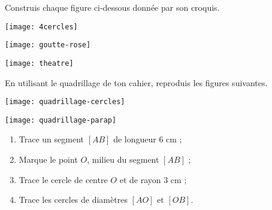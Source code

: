 
\vspace*{3cm}

\phantom{coucou}

\pagebreak



\begin{exercice}
Construis chaque figure ci-dessous donnée par son croquis.
\begin{colenumerate}{2}
 \item
 
 \texttt{[image: 4cercles]}
 \item
 
\texttt{[image: goutte-rose]}
 \item
 
\texttt{[image: theatre]}
 \end{colenumerate}
\end{exercice}


\begin{exercice}
En utilisant le quadrillage de ton cahier, reproduis les figures suivantes.
\begin{colenumerate}{2}
 \item
 
 \texttt{[image: quadrillage-cercles]}
 \item
 
\texttt{[image: quadrillage-parap]}

 \end{colenumerate}
\end{exercice}


\begin{exercice}[À construire]
\begin{enumerate}
 \item Trace un segment $[AB]$ de longueur 6 cm ;
 \item Marque le point $O$, milieu du segment $[AB]$ ;
 \item Trace le cercle de centre $O$ et de rayon 3 cm ;
 \item Trace les cercles de diamètres $[AO]$ et $[OB]$.
 \end{enumerate}
\end{exercice}



\columnbreak


